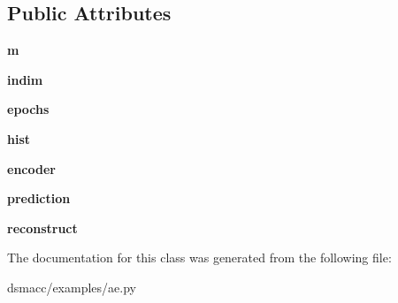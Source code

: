 \subsection*{Public Attributes}
\begin{DoxyCompactItemize}
\item 
\mbox{\label{classdsmacc_1_1examples_1_1ae_1_1ae_a671bea7a3bc7ec7b41bf73ff61e18443}} 
{\bfseries m}
\item 
\mbox{\label{classdsmacc_1_1examples_1_1ae_1_1ae_ac796f63f9cf3ca23e4f6407383982a39}} 
{\bfseries indim}
\item 
\mbox{\label{classdsmacc_1_1examples_1_1ae_1_1ae_a52375aea435f992746c96425a7d52109}} 
{\bfseries epochs}
\item 
\mbox{\label{classdsmacc_1_1examples_1_1ae_1_1ae_aa2e8a34b4785589f51cde0f6017991f1}} 
{\bfseries hist}
\item 
\mbox{\label{classdsmacc_1_1examples_1_1ae_1_1ae_a8d348e7f56548c64b6aafbbd52a5d63c}} 
{\bfseries encoder}
\item 
\mbox{\label{classdsmacc_1_1examples_1_1ae_1_1ae_a233fbb9a841ecb18afcae8b7a7162a44}} 
{\bfseries prediction}
\item 
\mbox{\label{classdsmacc_1_1examples_1_1ae_1_1ae_ac2826589623790399f12596f5a98772f}} 
{\bfseries reconstruct}
\end{DoxyCompactItemize}


The documentation for this class was generated from the following file\+:\begin{DoxyCompactItemize}
\item 
dsmacc/examples/ae.\+py\end{DoxyCompactItemize}
